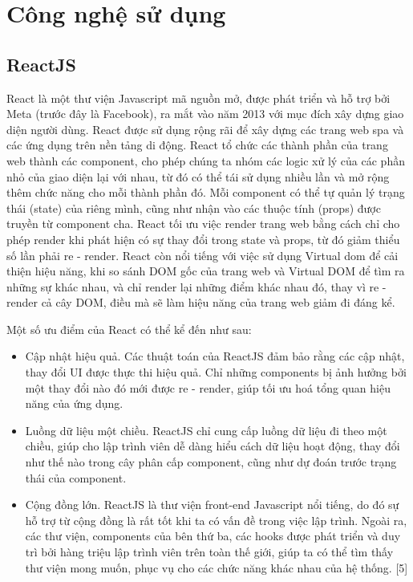 \section{Công nghệ sử dụng}
\subsection{ReactJS}
React là một thư viện Javascript mã nguồn mở, được phát triển và hỗ trợ bởi
Meta (trước đây là Facebook), ra mắt vào năm 2013 với mục đích xây dựng giao
diện người dùng. React được sử dụng rộng rãi để xây dựng các trang web \acrfull*{spa} và các ứng dụng trên nền tảng di động. React tổ chức
các thành phần của trang web thành các component, cho phép chúng ta nhóm các
logic xử lý của các phần nhỏ của giao diện lại với nhau, từ đó có thể tái sử
dụng nhiều lần và mở rộng thêm chức năng cho mỗi thành phần đó. Mỗi component
có thể tự quản lý trạng thái (state) của riêng mình, cũng như nhận vào các
thuộc tính (props) được truyền từ component cha. React tối ưu việc render trang
web bằng cách chỉ cho phép render khi phát hiện có sự thay đổi trong state và
props, từ đó giảm thiểu số lần phải re - render. React còn nổi tiếng với việc
sử dụng Virtual \acrshort*{dom} để cải thiện hiệu năng, khi so sánh DOM gốc của trang web
và Virtual DOM để tìm ra những sự khác nhau, và chỉ render lại những điểm khác
nhau đó, thay vì re - render cả cây DOM, điều mà sẽ làm hiệu năng của trang web
giảm đi đáng kể.
\par
Một số ưu điểm của React có thể kể đến như sau:
\begin{itemize}
    \item Cập nhật hiệu quả. Các thuật toán của ReactJS đảm bảo rằng các cập nhật, thay
          đổi UI được thực thi hiệu quả. Chỉ những components bị ảnh hưởng bởi một thay
          đổi nào đó mới được re - render, giúp tối ưu hoá tổng quan hiệu năng của ứng
          dụng.
    \item Luồng dữ liệu một chiều. ReactJS chỉ cung cấp luồng dữ liệu đi theo một chiều,
          giúp cho lập trình viên dễ dàng hiểu cách dữ liệu hoạt động, thay đổi như thế
          nào trong cây phân cấp component, cũng như dự đoán trước trạng thái của
          component.
    \item Cộng đồng lớn. ReactJS là thư viện front-end Javascript nổi tiếng, do đó sự hỗ
          trợ từ cộng đồng là rất tốt khi ta có vấn đề trong việc lập trình. Ngoài ra,
          các thư viện, components của bên thứ ba, các hooks được phát triển và duy trì
          bởi hàng triệu lập trình viên trên toàn thế giới, giúp ta có thể tìm thấy thư
          viện mong muốn, phục vụ cho các chức năng khác nhau của hệ thống. [5]
\end{itemize}
